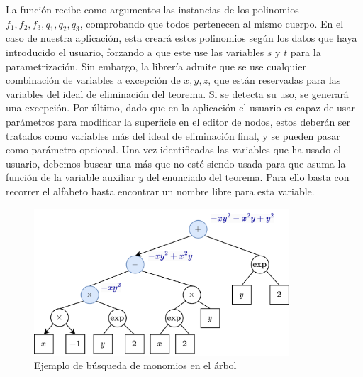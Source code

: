 La función recibe como argumentos las instancias de los polinomios $f_1,f_2,f_3,q_1,q_2,q_3$, comprobando que todos pertenecen al mismo cuerpo. En el caso de nuestra aplicación, esta creará estos polinomios según los datos que haya introducido el usuario, forzando a que este use las variables $s$ y $t$ para la parametrización. Sin embargo, la librería admite que se use cualquier combinación de variables a excepción de $x,y,z$, que están reservadas para las variables del ideal de eliminación del teorema. Si se detecta su uso, se generará una excepción. Por último, dado que en la aplicación el usuario es capaz de usar parámetros para modificar la superficie en el editor de nodos, estos deberán ser tratados como variables más del ideal de eliminación final, y se pueden pasar como parámetro opcional. Una vez identificadas las variables que ha usado el usuario, debemos buscar una más que no esté siendo usada para que asuma la función de la variable auxiliar $y$ del enunciado del teorema. Para ello basta con recorrer el alfabeto hasta encontrar un nombre libre para esta variable.\newline
\begin{figure}[ht!]
    \centering
    \includegraphics[width=0.85\textwidth]{Plantilla-TFG-master/img/busquedaMon.png}
    \caption{Ejemplo de búsqueda de monomios en el árbol}
    \label{fig:busquedaMonom}
\end{figure}

